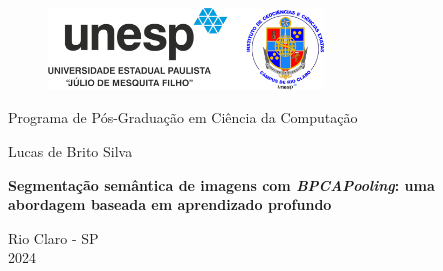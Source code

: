 \begin{titlepage}
    \begin{figure}[H]
        \centering
        \includegraphics[width=0.65\textwidth]{recursos/imagens/capa/logo_unesp.png}
    \end{figure}
   \begin{center}
        {\large Programa de Pós-Graduação em Ciência da Computação}


       \vspace*{2cm}

       \Large Lucas de Brito Silva

       \vspace*{2cm}
       
       \textbf{Segmentação semântica de imagens com \textit{BPCAPooling}: uma abordagem baseada em aprendizado profundo}
       \normalsize
       
       \vspace{1.5cm}


       \vfill
            
       Rio Claro - SP \\
       2024
            
   \end{center}
\end{titlepage}
